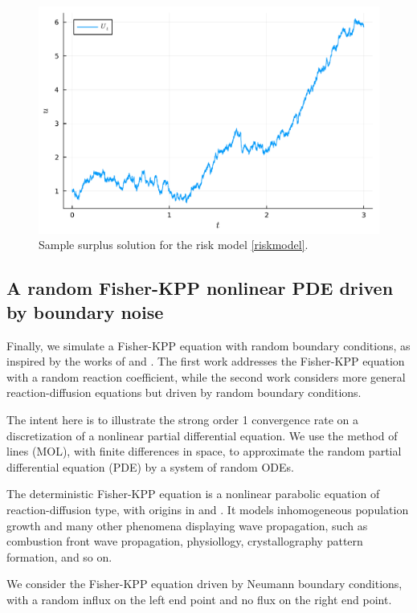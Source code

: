 \documentclass[reqno,12pt]{amsart}
\theoremstyle{plain} %
\theoremstyle{definition} %
\begin{document}
\begin{figure}[htb]
    \includegraphics[scale=0.6]{img/riskmodel_surplus.pdf}
    \caption{Sample surplus solution for the risk model \eqref{riskmodel}.}
    \label{figriskmodelsurplus}
\end{figure}

\subsection{A random Fisher-KPP nonlinear PDE driven by boundary noise}

Finally, we simulate a Fisher-KPP equation with random boundary conditions, as inspired by the works of \cite{SalakoShen2020}  and \cite{FreidlinWentzell1992}. The first work addresses the Fisher-KPP equation with a random reaction coefficient, while the second work considers more general reaction-diffusion equations but driven by random boundary conditions.

The intent here is to illustrate the strong order 1 convergence rate on a discretization of a nonlinear partial differential equation. We use the method of lines (MOL), with finite differences in space, to approximate the random partial differential equation (PDE) by a system of random ODEs.

The deterministic Fisher-KPP equation is a nonlinear parabolic equation of reaction-diffusion type, with origins in \cite{Fisher1937} and \cite{KPP1937}. It models inhomogeneous population growth and many other phenomena displaying wave propagation, such as combustion front wave propagation, physiollogy, crystallography pattern formation, and so on.

We consider the Fisher-KPP equation driven by Neumann boundary conditions, with a random influx on the left end point and no flux on the right end point.
\end{document}
